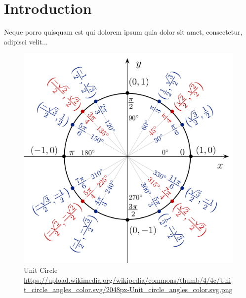 \chapter{Introduction}
\newpage

Neque porro quisquam est qui dolorem ipsum quia dolor sit amet, consectetur, adipisci velit...

\begin{figure}[ht]
	\begin{center}
		\includegraphics[width=0.6\linewidth]{Figures/Unit_circle.png}
		\captionsetup{justification=centering}
		\caption[Unit Circle]{Unit Circle \\ \url{https://upload.wikimedia.org/wikipedia/commons/thumb/4/4c/Unit_circle\_angles_color.svg/2048px-Unit_circle_angles_color.svg.png}}
		\label{fig:cover}
	\end{center}
\end{figure}